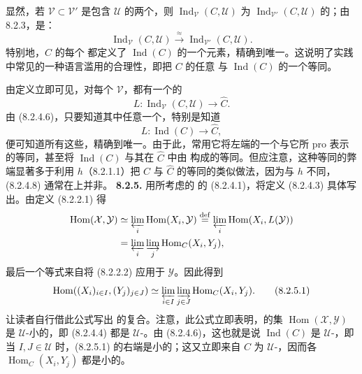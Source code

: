 显然，若 $\mathcal V\subset\mathcal V'$ 是包含 $\mathcal U$ 的两个，则 $\operatorname{Ind}_{\mathcal V}(C,\mathcal U)$ 为 $\operatorname{Ind}_{\mathcal V'}(C,\mathcal U)$ 的；由 8.2.3，是：
\[
\operatorname{Ind}_{\mathcal V}(C,\mathcal U)
\xrightarrow{\approx}\operatorname{Ind}_{\mathcal V'}(C,\mathcal U).\tag{8.2.4.6}
\]
特别地，$C$ 的每个 都定义了 $\operatorname{Ind}(C)$ 的一个元素，精确到唯一。这说明了实践中常见的一种语言滥用的合理性，即把 $C$ 的任意 与 $\operatorname{Ind}(C)$ 的一个等同。

由定义立即可见，对每个 $\mathcal V$，都有一个的
\[
L:\operatorname{Ind}_{\mathcal V}(C,\mathcal U)\longrightarrow\widehat C.\tag{8.2.4.7}
\]
由 (8.2.4.6)，只要知道其中任意一个，特别是知道
\[
L:\operatorname{Ind}(C)\longrightarrow\widehat C,\tag{8.2.4.8}
\]
便可知道所有这些，精确到唯一。由于此，常用它将左端的一个与它所 pro 表示的等同，甚至将 $\operatorname{Ind}(C)$ 与其在 $\widehat C$ 中由 构成的等同。但应注意，这种等同的弊端显著多于利用 $h$（8.2.1.1）把 $C$ 与 $\widehat C$ 的等同的类似做法，因为与 $h$ 不同， (8.2.4.8) 通常在上并非。
\textbf{8.2.5.} 用所考虑的 的 (8.2.4.1)，将定义 (8.2.4.3) 具体写出。由定义 (8.2.2.1) 得
\[
\begin{aligned}
\operatorname{Hom}(\mathcal X,\mathcal Y)
&\simeq\varprojlim_i\operatorname{Hom}(X_i,\mathcal Y)
\overset{\mathrm{def}}=\varprojlim_i\operatorname{Hom}(X_i,L(\mathcal Y))\\
&=\varprojlim_i\varinjlim_j\operatorname{Hom}_C(X_i,Y_j),
\end{aligned}
\]
最后一个等式来自将 (8.2.2.2) 应用于 $\mathcal Y$。因此得到
\[
\operatorname{Hom}((X_i)_{i\in I},(Y_j)_{j\in J})
\simeq\varprojlim_{i\in I}\varinjlim_{j\in J}\operatorname{Hom}_C(X_i,Y_j).\tag{8.2.5.1}
\]
让读者自行借此公式写出 的复合。注意，此公式立即表明，的集 $\operatorname{Hom}(\mathcal X,\mathcal Y)$ 是 $\mathcal U$-小的，即 (8.2.4.4) 都是 $\mathcal U$-。由 (8.2.4.6)，这也就是说 $\operatorname{Ind}(C)$ 是 $\mathcal U$-，即当 $I,J\in\mathcal U$ 时，(8.2.5.1) 的右端是小的；这又立即来自 $C$ 为 $\mathcal U$-，因而各 $\operatorname{Hom}_C(X_i,Y_j)$ 都是小的。

